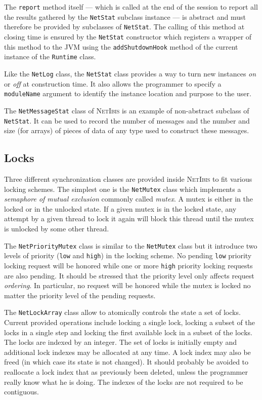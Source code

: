 \documentclass[11pt]{book}
\def\NetIbis{\textsc{NetIbis}\xspace}
\begin{document}
The \texttt{report} method itself --- which is called at the end of
the session to report all the results gathered by the \texttt{NetStat}
subclass instance --- is abstract and must therefore be
provided by subclasses of \texttt{NetStat}. The calling of this method
at closing time is ensured by the \texttt{NetStat} constructor which
registers a wrapper of this method to the JVM using the
\texttt{addShutdownHook} method of the current instance of the
\texttt{Runtime} class.

Like the \texttt{NetLog} class, the \texttt{NetStat} class provides a
way to turn new instances \emph{on} or \emph{off} at construction
time. It also allows the programmer to specify a \texttt{moduleName}
argument to identify the instance location and purpose to the user.

The \texttt{NetMessageStat} class of \NetIbis is an example of
non-abstract subclass of \texttt{NetStat}. It can be used to record
the number of messages and the number and size (for arrays) of pieces
of data of any type used to construct these messages.


\subsection{Locks}
\label{sec:locks}

Three different synchronization classes are provided inside \NetIbis
to fit various locking schemes. The simplest one is the
\texttt{NetMutex} class which implements a \emph{semaphore of mutual
  exclusion} commonly called \emph{mutex}. A mutex is either in the
locked or in the unlocked state. If a given mutex is in the locked
state, any attempt by a given thread to lock it again will block this
thread until the mutex is unlocked by some other thread.

The \texttt{NetPriorityMutex} class is similar to the
\texttt{NetMutex} class but it introduce two levels of priority
(\texttt{low} and \texttt{high}) in the locking scheme. No pending
\texttt{low} priority locking request will be honored while one or
more \texttt{high} priority locking requests are also pending. It
should be stressed that the priority level only affects request
\emph{ordering}. In particular, no request will be honored while the
mutex is locked no matter the priority level of the pending requests.

The \texttt{NetLockArray} class allow to atomically controls the state
a set of locks. Current provided operations include locking a single
lock, locking a subset of the locks in a single step and locking the
first available lock in a subset of the locks. The locks are indexed
by an integer. The set of locks is initially empty and additional lock
indexes may be allocated at any time. A lock index may also be freed
(in which case its state is not changed). It should probably be
avoided to reallocate a lock index that as previously been deleted,
unless the programmer really know what he is doing. The indexes of the
locks are not required to be contiguous.
\end{document}
